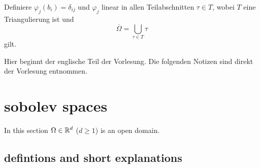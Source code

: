 
Definiere $\varphi_j(b_i) = \delta_{ij}$ und $\varphi_j$ linear in allen Teilabschnitten $\tau \in T$, wobei $T$ eine Triangulierung ist und 
\begin{equation*}
	\overline{\Omega} = \bigcup\limits_{\tau\in T}\tau
\end{equation*}
gilt.





Hier beginnt der englische Teil der Vorlesung. Die folgenden Notizen sind direkt der Vorlesung entnommen. 

\section{sobolev spaces}
In this section $\Omega \in \mathbb{R}^d$ ($d \geq 1$) is an open domain.

\subsection{defintions and short explanations}


